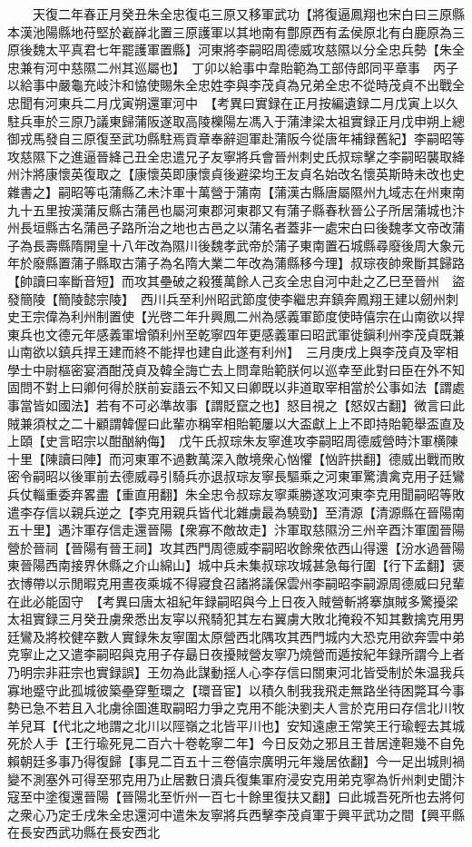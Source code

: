 　　天復二年春正月癸丑朱全忠復屯三原又移軍武功【將復逼鳳翔也宋白曰三原縣本漢池陽縣地苻堅於嶻嶭北置三原護軍以其地南有鄷原西有孟侯原北有白鹿原為三原後魏太平真君七年罷護軍置縣】河東將李嗣昭周德威攻慈隰以分全忠兵勢【朱全忠兼有河中慈隰二州其巡屬也】　丁卯以給事中韋貽範為工部侍郎同平章事　丙子以給事中嚴龜充岐汴和恊使賜朱全忠姓李與李茂貞為兄弟全忠不從時茂貞不出戰全忠聞有河東兵二月戊寅朔還軍河中　【考異曰實録在正月按編遺録二月戊寅上以久駐兵車於三原乃議東歸蒲阪遂取高陵櫟陽左馮入于蒲津梁太祖實録正月戊申朔上總御戎馬發自三原復至武功縣駐焉貢章奉辭迴軍赴蒲阪今從唐年補録舊紀】李嗣昭等攻慈隰下之進逼晉絳己丑全忠遣兄子友寧將兵會晉州刺史氏叔琮擊之李嗣昭襲取絳州汴將康懷英復取之【康懷英即康懷貞後避梁均王友貞名始改名懷英斯時未改也史雜書之】嗣昭等屯蒲縣乙未汴軍十萬營于蒲南【蒲漢古縣唐屬隰州九域志在州東南九十五里按漢蒲反縣古蒲邑也屬河東郡河東郡又有蒲子縣春秋晉公子所居蒲城也汴州長垣縣古名蒲邑子路所治之地也古邑之以蒲名者蓋非一處宋白曰後魏孝文帝改蒲子為長壽縣隋開皇十八年改為隰川後魏孝武帝於蒲子東南置石城縣尋廢後周大象元年於廢縣置蒲子縣取古蒲子為名隋大業二年改為蒲縣移今理】叔琮夜帥衆斷其歸路【帥讀曰率斷音短】而攻其壘破之殺獲萬餘人己亥全忠自河中赴之乙巳至晉州　盜發簡陵【簡陵懿宗陵】　西川兵至利州昭武節度使李繼忠弃鎮奔鳳翔王建以劒州刺史王宗偉為利州制置使【光啓二年升興鳳二州為感義軍節度使時僖宗在山南欲以捍東兵也文德元年感義軍增領利州至乾寧四年更感義軍曰昭武軍徙鎭利州李茂貞既兼山南欲以鎮兵捍王建而終不能捍也建自此遂有利州】　三月庚戌上與李茂貞及宰相學士中尉樞密宴酒酣茂貞及韓全誨亡去上問韋貽範朕何以巡幸至此對曰臣在外不知固問不對上曰卿何得於朕前妄語云不知又曰卿既以非道取宰相當於公事如法【謂處事當皆如國法】若有不可必準故事【謂貶竄之也】怒目視之【怒奴古翻】微言曰此賊兼須杖之二十顧謂韓偓曰此輩亦稱宰相貽範屢以大盃獻上上不即持貽範舉盃直及上頤【史言昭宗以酣酗納侮】　戊午氏叔琮朱友寧進攻李嗣昭周德威營時汴軍横陳十里【陳讀曰陣】而河東軍不過數萬深入敵境衆心忷懼【忷許拱翻】德威出戰而敗密令嗣昭以後軍前去德威尋引騎兵亦退叔琮友寧長驅乘之河東軍驚潰禽克用子廷鸞兵仗輜重委弃畧盡【重直用翻】朱全忠令叔琮友寧乘勝遂攻河東李克用聞嗣昭等敗遣李存信以親兵逆之【李克用親兵皆代北雜虜最為驍勁】至清源【清源縣在晉陽南五十里】遇汴軍存信走還晉陽【衆寡不敵故走】汴軍取慈隰汾三州辛酉汴軍圍晉陽營於晉祠【晉陽有晉王祠】攻其西門周德威李嗣昭收餘衆依西山得還【汾水過晉陽東晉陽西南接界休縣之介山綿山】城中兵未集叔琮攻城甚急每行圍【行下孟翻】褒衣博帶以示閒暇克用晝夜乘城不得寢食召諸將議保雲州李嗣昭李嗣源周德威曰兒輩在此必能固守　【考異曰唐太祖紀年録嗣昭與今上日夜入賊營斬將搴旗賊多驚擾梁太祖實録三月癸丑虜衆悉出友寜以飛騎犯其左右翼虜大敗北掩殺不知其數擒克用男廷鸞及將校健卒數人實録朱友寧圍太原營西北隅攻其西門城内大恐克用欲奔雲中弟克寧止之又遣李嗣昭與克用子存朂日夜擾賊營友寧乃燒營而遁按紀年録所謂今上者乃明宗非莊宗也實録誤】王勿為此謀動揺人心李存信曰關東河北皆受制於朱温我兵寡地蹙守此孤城彼築壘穿塹環之【環音宦】以積久制我我飛走無路坐待困斃耳今事勢已急不若且入北虜徐圖進取嗣昭力爭之克用不能決劉夫人言於克用曰存信北川牧羊兒耳【代北之地謂之北川以陘嶺之北皆平川也】安知遠慮王常笑王行瑜輕去其城死於人手【王行瑜死見二百六十卷乾寧二年】今日反効之邪且王昔居達靼幾不自免賴朝廷多事乃得復歸【事見二百五十三卷僖宗廣明元年幾居依翻】今一足出城則禍變不測塞外可得至邪克用乃止居數日潰兵復集軍府浸安克用弟克寧為忻州刺史聞汴寇至中塗復還晉陽【晉陽北至忻州一百七十餘里復扶又翻】曰此城吾死所也去將何之衆心乃定壬戌朱全忠還河中遣朱友寧將兵西擊李茂貞軍于興平武功之間【興平縣在長安西武功縣在長安西北